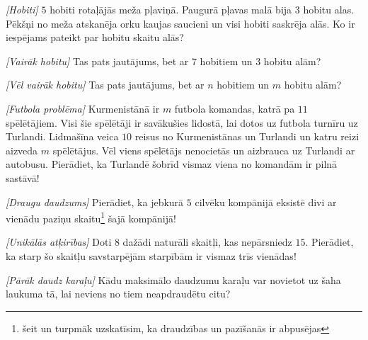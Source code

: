 




\noindent 

\begin{problem}
\textit{[Hobiti]}
$5$ hobiti rotaļājās meža pļaviņā. Paugurā pļavas malā bija $3$ hobitu alas. Pēkšņi no meža atskanēja orku kaujas saucieni un visi hobiti saskrēja alās. Ko ir iespējams pateikt par hobitu skaitu alās?
\end{problem}


\begin{problem}
\textit{[Vairāk hobitu]}
Tas pats jautājums, bet ar $7$ hobitiem un $3$ hobitu alām?
\end{problem}

\begin{problem}
\textit{[Vēl vairāk hobitu]}
Tas pats jautājums, bet ar $n$ hobitiem un $m$ hobitu alām?
\end{problem}

\begin{problem}
\textit{[Futbola problēma]}
Kurmenistānā ir $m$ futbola komandas, katrā pa $11$ spēlētājiem. Visi šie spēlētāji ir savākušies lidostā, lai dotos uz futbola turnīru uz Turlandi. Lidmašīna veica $10$ reisus no Kurmenistānas un Turlandi un katru reizi aizveda $m$ spēlētājus. Vēl viens spēlētājs nenocietās un aizbrauca uz Turlandi ar autobusu. Pierādiet, ka Turlandē šobrīd vismaz viena no komandām ir pilnā sastāvā!

\end{problem}

\begin{problem}
\textit{[Draugu daudzums]}
Pierādiet, ka jebkurā $5$ cilvēku kompānijā eksistē divi ar vienādu paziņu skaitu\footnote{šeit un turpmāk uzskatīsim, ka draudzības un pazīšanās ir abpusējas} šajā kompānijā!
\end{problem}

\begin{problem}
\textit{[Unikālās atķirības]}
Doti $8$ dažādi naturāli skaitļi, kas nepārsniedz $15$. Pierādiet, ka starp šo skaitļu savstarpējām starpībām ir vismaz trīs vienādas!
\end{problem}

\begin{problem}
\textit{[Pārāk daudz karaļu]}
Kādu maksimālo daudzumu karaļu var novietot uz šaha laukuma tā, lai neviens no tiem neapdraudētu citu?
\end{problem}

